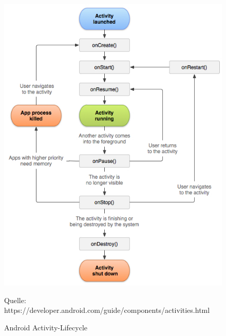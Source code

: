 \begin{figure}[h]
\centering
\includegraphics[width=0.8\linewidth]{content/images/Android-ActivityLifecycle}
\caption{Android Activity-Lifecycle}
Quelle: https://developer.android.com/guide/components/activities.html
\label{pic:androidActivityLifecycle}
\end{figure}

